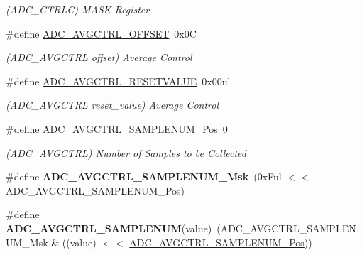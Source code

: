 \begin{DoxyCompactItemize}
\begin{DoxyCompactList}\small\item\em (A\+D\+C\+\_\+\+C\+T\+R\+L\+C) M\+A\+S\+K Register \end{DoxyCompactList}\item 
\hypertarget{group___s_a_m_l21___a_d_c_ga360fdef32b21cb1a277faa31db6996fd}{}\#define \hyperlink{group___s_a_m_l21___a_d_c_ga360fdef32b21cb1a277faa31db6996fd}{A\+D\+C\+\_\+\+A\+V\+G\+C\+T\+R\+L\+\_\+\+O\+F\+F\+S\+E\+T}~0x0\+C\label{group___s_a_m_l21___a_d_c_ga360fdef32b21cb1a277faa31db6996fd}

\begin{DoxyCompactList}\small\item\em (A\+D\+C\+\_\+\+A\+V\+G\+C\+T\+R\+L offset) Average Control \end{DoxyCompactList}\item 
\hypertarget{group___s_a_m_l21___a_d_c_ga8bf6910b7cb768949d87054bef54fc89}{}\#define \hyperlink{group___s_a_m_l21___a_d_c_ga8bf6910b7cb768949d87054bef54fc89}{A\+D\+C\+\_\+\+A\+V\+G\+C\+T\+R\+L\+\_\+\+R\+E\+S\+E\+T\+V\+A\+L\+U\+E}~0x00ul\label{group___s_a_m_l21___a_d_c_ga8bf6910b7cb768949d87054bef54fc89}

\begin{DoxyCompactList}\small\item\em (A\+D\+C\+\_\+\+A\+V\+G\+C\+T\+R\+L reset\+\_\+value) Average Control \end{DoxyCompactList}\item 
\hypertarget{group___s_a_m_l21___a_d_c_gae24ef894295278762f9293105f06ffb9}{}\#define \hyperlink{group___s_a_m_l21___a_d_c_gae24ef894295278762f9293105f06ffb9}{A\+D\+C\+\_\+\+A\+V\+G\+C\+T\+R\+L\+\_\+\+S\+A\+M\+P\+L\+E\+N\+U\+M\+\_\+\+Pos}~0\label{group___s_a_m_l21___a_d_c_gae24ef894295278762f9293105f06ffb9}

\begin{DoxyCompactList}\small\item\em (A\+D\+C\+\_\+\+A\+V\+G\+C\+T\+R\+L) Number of Samples to be Collected \end{DoxyCompactList}\item 
\hypertarget{group___s_a_m_l21___a_d_c_ga10a4df299fe2d9a69e31fd85e120ea4e}{}\#define {\bfseries A\+D\+C\+\_\+\+A\+V\+G\+C\+T\+R\+L\+\_\+\+S\+A\+M\+P\+L\+E\+N\+U\+M\+\_\+\+Msk}~(0x\+Ful $<$$<$ A\+D\+C\+\_\+\+A\+V\+G\+C\+T\+R\+L\+\_\+\+S\+A\+M\+P\+L\+E\+N\+U\+M\+\_\+\+Pos)\label{group___s_a_m_l21___a_d_c_ga10a4df299fe2d9a69e31fd85e120ea4e}

\item 
\hypertarget{group___s_a_m_l21___a_d_c_gad3b73cbf367201bc6ccea836a008b069}{}\#define {\bfseries A\+D\+C\+\_\+\+A\+V\+G\+C\+T\+R\+L\+\_\+\+S\+A\+M\+P\+L\+E\+N\+U\+M}(value)~(A\+D\+C\+\_\+\+A\+V\+G\+C\+T\+R\+L\+\_\+\+S\+A\+M\+P\+L\+E\+N\+U\+M\+\_\+\+Msk \& ((value) $<$$<$ \hyperlink{group___s_a_m_l21___a_d_c_gae24ef894295278762f9293105f06ffb9}{A\+D\+C\+\_\+\+A\+V\+G\+C\+T\+R\+L\+\_\+\+S\+A\+M\+P\+L\+E\+N\+U\+M\+\_\+\+Pos}))\label{group___s_a_m_l21___a_d_c_gad3b73cbf367201bc6ccea836a008b069}


\end{DoxyCompactItemize}
